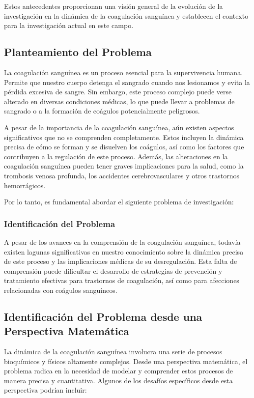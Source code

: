 \documentclass{article}
\begin{document}
Estos antecedentes proporcionan una visión general de la evolución de la investigación en la dinámica de la coagulación sanguínea y establecen el contexto para la investigación actual en este campo.
\subsection{Planteamiento del Problema}

La coagulación sanguínea es un proceso esencial para la supervivencia humana. Permite que nuestro cuerpo detenga el sangrado cuando nos lesionamos y evita la pérdida excesiva de sangre. Sin embargo, este proceso complejo puede verse alterado en diversas condiciones médicas, lo que puede llevar a problemas de sangrado o a la formación de coágulos potencialmente peligrosos.

A pesar de la importancia de la coagulación sanguínea, aún existen aspectos significativos que no se comprenden completamente. Estos incluyen la dinámica precisa de cómo se forman y se disuelven los coágulos, así como los factores que contribuyen a la regulación de este proceso. Además, las alteraciones en la coagulación sanguínea pueden tener graves implicaciones para la salud, como la trombosis venosa profunda, los accidentes cerebrovasculares y otros trastornos hemorrágicos.

Por lo tanto, es fundamental abordar el siguiente problema de investigación:

\subsubsection{Identificación del Problema}

A pesar de los avances en la comprensión de la coagulación sanguínea, todavía existen lagunas significativas en nuestro conocimiento sobre la dinámica precisa de este proceso y las implicaciones médicas de su desregulación. Esta falta de comprensión puede dificultar el desarrollo de estrategias de prevención y tratamiento efectivas para trastornos de coagulación, así como para afecciones relacionadas con coágulos sanguíneos.
\subsection{Identificación del Problema desde una Perspectiva Matemática}

La dinámica de la coagulación sanguínea involucra una serie de procesos bioquímicos y físicos altamente complejos. Desde una perspectiva matemática, el problema radica en la necesidad de modelar y comprender estos procesos de manera precisa y cuantitativa. Algunos de los desafíos específicos desde esta perspectiva podrían incluir:
\end{document}
